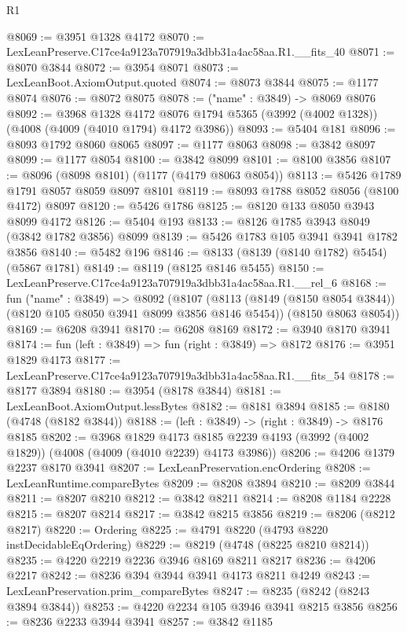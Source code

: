 \begin{lexlean}{R1}
\begin{coremodule}
@8069 := @3951 @1328 @4172
@8070 := LexLeanPreserve.C17ce4a9123a707919a3dbb31a4ac58aa.R1.__fits_40
@8071 := @8070 @3844
@8072 := @3954 @8071
@8073 := LexLeanBoot.AxiomOutput.quoted
@8074 := @8073 @3844
@8075 := @1177 @8074
@8076 := @8072 @8075
@8078 := ("name" : @3849) -> @8069 @8076
@8092 := @3968
    @1328
    @4172
    @8076
    @1794
    @5365
    (@3992 (@4002 @1328))
    (@4008 (@4009 (@4010 @1794) @4172 @3986))
@8093 := @5404 @181
@8096 := @8093 @1792 @8060 @8065
@8097 := @1177 @8063
@8098 := @3842 @8097
@8099 := @1177 @8054
@8100 := @3842 @8099
@8101 := @8100 @3856
@8107 := @8096 (@8098 @8101) (@1177 (@4179 @8063 @8054))
@8113 := @5426 @1789 @1791 @8057 @8059 @8097 @8101
@8119 := @8093 @1788 @8052 @8056 (@8100 @4172) @8097
@8120 := @5426 @1786
@8125 := @8120 @133 @8050 @3943 @8099 @4172
@8126 := @5404 @193
@8133 := @8126 @1785 @3943 @8049 (@3842 @1782 @3856) @8099
@8139 := @5426 @1783 @105 @3941 @3941 @1782 @3856
@8140 := @5482 @196
@8146 := @8133 (@8139 (@8140 @1782) @5454) (@5867 @1781)
@8149 := @8119 (@8125 @8146 @5455)
@8150 := LexLeanPreserve.C17ce4a9123a707919a3dbb31a4ac58aa.R1.__rel_6
@8168 := fun ("name" : @3849) =>
  @8092
    (@8107
      (@8113 (@8149 (@8150 @8054 @3844)) (@8120 @105 @8050 @3941 @8099 @3856 @8146 @5454))
      (@8150 @8063 @8054))
@8169 := @6208 @3941
@8170 := @6208 @8169
@8172 := @3940 @8170 @3941
@8174 := fun (left : @3849) => fun (right : @3849) => @8172
@8176 := @3951 @1829 @4173
@8177 := LexLeanPreserve.C17ce4a9123a707919a3dbb31a4ac58aa.R1.__fits_54
@8178 := @8177 @3894
@8180 := @3954 (@8178 @3844)
@8181 := LexLeanBoot.AxiomOutput.lessBytes
@8182 := @8181 @3894
@8185 := @8180 (@4748 (@8182 @3844))
@8188 := (left : @3849) -> (right : @3849) -> @8176 @8185
@8202 := @3968
    @1829
    @4173
    @8185
    @2239
    @4193
    (@3992 (@4002 @1829))
    (@4008 (@4009 (@4010 @2239) @4173 @3986))
@8206 := @4206 @1379 @2237 @8170 @3941
@8207 := LexLeanPreservation.encOrdering
@8208 := LexLeanRuntime.compareBytes
@8209 := @8208 @3894
@8210 := @8209 @3844
@8211 := @8207 @8210
@8212 := @3842 @8211
@8214 := @8208 @1184 @2228
@8215 := @8207 @8214
@8217 := @3842 @8215 @3856
@8219 := @8206 (@8212 @8217)
@8220 := Ordering
@8225 := @4791 @8220 (@4793 @8220 instDecidableEqOrdering)
@8229 := @8219 (@4748 (@8225 @8210 @8214))
@8235 := @4220 @2219 @2236 @3946 @8169 @8211 @8217
@8236 := @4206 @2217
@8242 := @8236 @394 @3944 @3941 @4173 @8211 @4249
@8243 := LexLeanPreservation.prim_compareBytes
@8247 := @8235 (@8242 (@8243 @3894 @3844))
@8253 := @4220 @2234 @105 @3946 @3941 @8215 @3856
@8256 := @8236 @2233 @3944 @3941
@8257 := @3842 @1185

\end{coremodule}
\end{lexlean}
